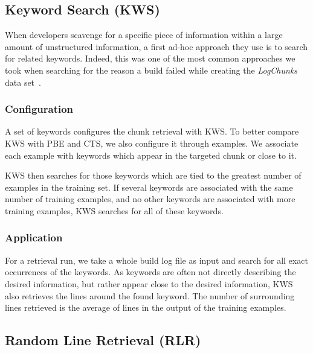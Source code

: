 \subsection{Keyword Search (KWS)}
When developers scavenge for a specific piece of information within a
large amount of unstructured information, a first ad-hoc approach they
use is to search for related keywords.
Indeed, this was one of the
most common approaches we took when searching for the reason a build
failed while creating the \emph{LogChunks} data
set~\cite{brandt2020logchunks}.

\subsubsection{Configuration}
A set of keywords configures the chunk retrieval with KWS\@.
To better
compare KWS with PBE and CTS, we also configure it through examples.
We associate each example with keywords which appear in the targeted
chunk or close to it.

KWS then searches for those keywords which are tied to the greatest
number of examples in the training set.
If several keywords are associated with the same number of training
examples, and no other keywords are associated with more training
examples, KWS searches for all of these keywords.

\subsubsection{Application}
For a retrieval run, we take a whole build log file as input and
search for all exact occurrences of the keywords.
As keywords are
often not directly describing the desired information, but rather
appear close to the desired information, KWS also retrieves the lines
around the found keyword.
The number of surrounding lines retrieved is
the average of lines in the output of the training examples.


\subsection{Random Line Retrieval (RLR)}
\label{sec:expl-rlr}

